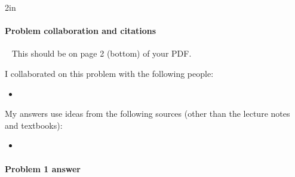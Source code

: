 
\begin{answerBox}{2in}          %

  
  \paragraph{Problem  collaboration and citations}~\GradescopeComment
  {This should be on page 2 (bottom) of your PDF.}

  I collaborated on this problem with the following people:
  \begin{blue}
    \begin{itemize}
    \item \REPLACEME            %
    \end{itemize}
  \end{blue}

  My answers use ideas from the following sources (other than the lecture notes and textbooks): 
  \begin{blue}
    \begin{itemize}
    \item \REPLACEME            %
    \end{itemize}
  \end{blue}

\end{answerBox}

\newpage

\paragraph{Problem 1 answer}~

